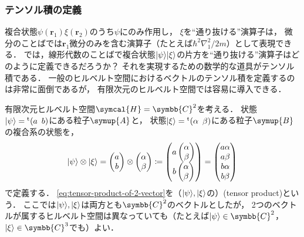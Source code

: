 \documentclass[
]{sotsu}
\begin{document}
\subsubsection{テンソル積の定義}

複合状態$\psi(\symbf{r}_1) \xi(\symbf{r}_2)$のうち$\psi$にのみ作用し，
$\xi$を``通り抜ける''演算子は，
微分のことばでは$\symbf{r}_1$微分のみを含む演算子（たとえば$\hbar^2 \nabla_1^2 / 2 m$）として表現できる．
では，線形代数のことばで複合状態$\ket{\psi} \ket{\xi}$の片方を``通り抜ける''演算子はどのように定義できるだろうか？\quad 
それを実現するための数学的な道具がテンソル積である．
一般のヒルベルト空間におけるベクトルのテンソル積を定義するのは非常に面倒であるが，
有限次元のヒルベルト空間では容易に導入できる．

有限次元ヒルベルト空間$\symcal{H} = \symbb{C}^2$を考える．
状態$\ket{\psi} = \cvector{a ; b}$にある粒子$\symup{A}$と，
状態$\ket{\xi} = \cvector{\alpha ; \beta}$にある粒子$\symup{B}$の複合系の状態を，
\begin{equation}
    \label{eq:tensor-product-of-2-vector}
    \ket{\psi} \otimes \ket{\xi}
        = 
        \begin{pmatrix}
            a  \\  b
        \end{pmatrix}
        \otimes 
        \begin{pmatrix}
            \alpha  \\  \beta
        \end{pmatrix}
        \coloneq
        \begin{pmatrix}
            a
            \begin{pmatrix}
                \alpha  \\  \beta
            \end{pmatrix}
            \\
            b
            \begin{pmatrix}
                \alpha  \\  \beta
            \end{pmatrix}
        \end{pmatrix}
        = 
        \begin{pmatrix}
            a \alpha  \\  a \beta  \\  b \alpha  \\  b \beta
        \end{pmatrix}
\end{equation}
で定義する．
\cref{eq:tensor-product-of-2-vector}を（$\ket{\psi}, \ket{\xi}$の）(tensor product)という．
ここでは$\ket{\psi}, \ket{\xi}$は両方とも$\symbb{C}^2$のベクトルとしたが，
2つのベクトルが属するヒルベルト空間は異なっていても（たとえば$\ket{\psi} \in \symbb{C}^2$，$\ket{\xi} \in \symbb{C}^3$でも）よい．
\end{document}
